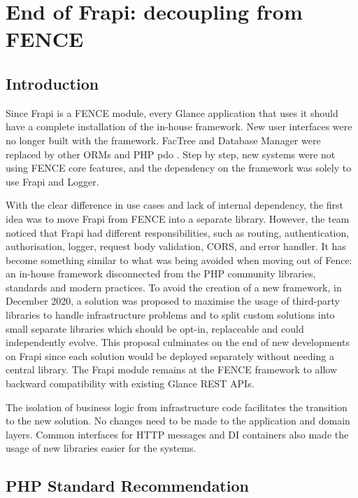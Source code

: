 \chapter{End of Frapi: decoupling from FENCE}
\label{chap5}

\section{Introduction}

Since Frapi is a FENCE module, every Glance application that uses it should have a complete installation of the in-house framework. New user interfaces were no longer built with the framework. FacTree and Database Manager were replaced by other ORMs and PHP \acrshort{pdo} \cite{php-pdo-doc}. Step by step, new systems were not using FENCE core features, and the dependency on the framework was solely to use Frapi and Logger.

With the clear difference in use cases and lack of internal dependency, the first idea was to move Frapi from FENCE into a separate library. However, the team noticed that Frapi had different responsibilities, such as routing, authentication, authorisation, logger, request body validation, CORS, and error handler. It has become something similar to what was being avoided when moving out of Fence: an in-house framework disconnected from the PHP community libraries, standards and modern practices. To avoid the creation of a new framework, in December 2020, a solution was proposed to maximise the usage of third-party libraries to handle infrastructure problems and to split custom solutions into small separate libraries which should be opt-in, replaceable and could independently evolve. This proposal culminates on the end of new developments on Frapi since each solution would be deployed separately without needing a central library. The Frapi module remains at the FENCE framework to allow backward compatibility with existing Glance REST APIs.

The isolation of business logic from infrastructure code facilitates the transition to the new solution. No changes need to be made to the application and domain layers. Common interfaces for HTTP messages and DI containers also made the usage of new libraries easier for the systems.

\section{PHP Standard Recommendation}

